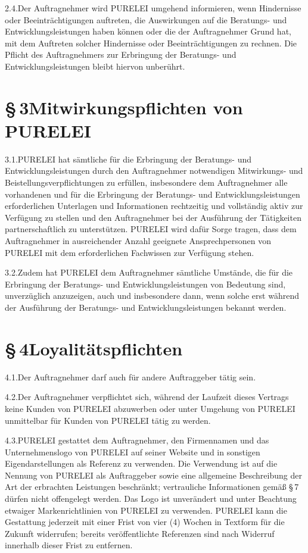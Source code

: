 \documentclass[11pt,a4paper]{article}
\newcommand{\ClientKurzname}{PURELEI}
\begin{document}
2.4.\quad Der Auftragnehmer wird \ClientKurzname{} umgehend informieren, wenn Hindernisse oder Beeinträchtigungen auftreten, die Auswirkungen auf die Beratungs- und Entwicklungsleistungen haben können oder die der Auftragnehmer Grund hat, mit dem Auftreten solcher Hindernisse oder Beeinträchtigungen zu rechnen. Die Pflicht des Auftragnehmers zur Erbringung der Beratungs- und Entwicklungsleistungen bleibt hiervon unberührt.

\section{§\,3\quad Mitwirkungspflichten von \ClientKurzname}

3.1.\quad \ClientKurzname{} hat sämtliche für die Erbringung der Beratungs- und Entwicklungsleistungen durch den Auftragnehmer notwendigen Mitwirkungs- und Beistellungsverpflichtungen zu erfüllen, insbesondere dem Auftragnehmer alle vorhandenen und für die Erbringung der Beratungs- und Entwicklungsleistungen erforderlichen Unterlagen und Informationen rechtzeitig und vollständig aktiv zur Verfügung zu stellen und den Auftragnehmer bei der Ausführung der Tätigkeiten partnerschaftlich zu unterstützen. \ClientKurzname{} wird dafür Sorge tragen, dass dem Auftragnehmer in ausreichender Anzahl geeignete Ansprechpersonen von \ClientKurzname{} mit dem erforderlichen Fachwissen zur Verfügung stehen.

3.2.\quad Zudem hat \ClientKurzname{} dem Auftragnehmer sämtliche Umstände, die für die Erbringung der Beratungs- und Entwicklungsleistungen von Bedeutung sind, unverzüglich anzuzeigen, auch und insbesondere dann, wenn solche erst während der Ausführung der Beratungs- und Entwicklungsleistungen bekannt werden.

\section{§\,4\quad Loyalitätspflichten}

4.1.\quad Der Auftragnehmer darf auch für andere Auftraggeber tätig sein.

4.2.\quad Der Auftragnehmer verpflichtet sich, während der Laufzeit dieses Vertrags keine Kunden von \ClientKurzname{} abzuwerben oder unter Umgehung von \ClientKurzname{} unmittelbar für Kunden von \ClientKurzname{} tätig zu werden.

4.3.\quad \ClientKurzname{} gestattet dem Auftragnehmer, den Firmennamen und das Unternehmenslogo von \ClientKurzname{} auf seiner Website und in sonstigen Eigendarstellungen als Referenz zu verwenden. Die Verwendung ist auf die Nennung von \ClientKurzname{} als Auftraggeber sowie eine allgemeine Beschreibung der Art der erbrachten Leistungen beschränkt; vertrauliche Informationen gemäß §\,7 dürfen nicht offengelegt werden. Das Logo ist unverändert und unter Beachtung etwaiger Markenrichtlinien von \ClientKurzname{} zu verwenden. \ClientKurzname{} kann die Gestattung jederzeit mit einer Frist von vier (4) Wochen in Textform für die Zukunft widerrufen; bereits veröffentlichte Referenzen sind nach Widerruf innerhalb dieser Frist zu entfernen.
\end{document}
